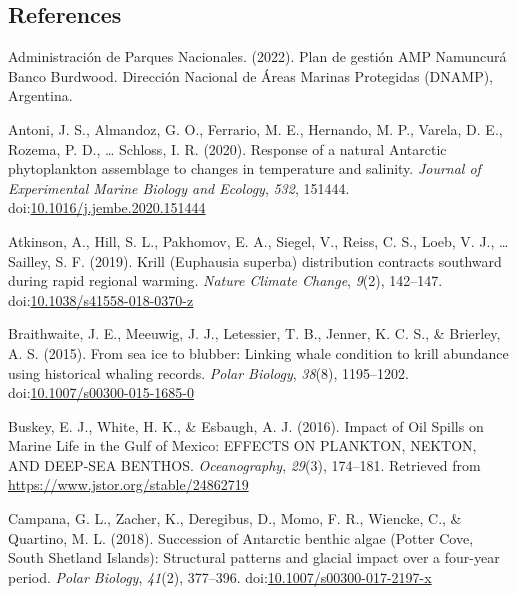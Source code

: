 \documentclass[
]{article}
\newlength{\cslhangindent}
\newenvironment{CSLReferences}[2] %
 {\begin{list}{}{%
  \setlength{\itemindent}{0pt}
  \setlength{\leftmargin}{0pt}
  \setlength{\parsep}{0pt}
  \ifodd #1
   \setlength{\leftmargin}{\cslhangindent}
   \setlength{\itemindent}{-1\cslhangindent}
  \fi
  \setlength{\itemsep}{#2\baselineskip}}}
 {\end{list}}
\begin{document}
\normalsize

\subsection*{References}\label{references}

\label{refs}
\begin{CSLReferences}{1}{0}
Administración de Parques Nacionales. (2022). {Plan de gestión AMP
Namuncurá Banco Burdwood}. {Dirección Nacional de Áreas Marinas
Protegidas (DNAMP), Argentina}.

Antoni, J. S., Almandoz, G. O., Ferrario, M. E., Hernando, M. P.,
Varela, D. E., Rozema, P. D., \ldots{} Schloss, I. R. (2020). Response
of a natural {Antarctic} phytoplankton assemblage to changes in
temperature and salinity. \emph{Journal of Experimental Marine Biology
and Ecology}, \emph{532}, 151444.
doi:\href{https://doi.org/10.1016/j.jembe.2020.151444}{10.1016/j.jembe.2020.151444}

Atkinson, A., Hill, S. L., Pakhomov, E. A., Siegel, V., Reiss, C. S.,
Loeb, V. J., \ldots{} Sailley, S. F. (2019). Krill ({Euphausia} superba)
distribution contracts southward during rapid regional warming.
\emph{Nature Climate Change}, \emph{9}(2), 142--147.
doi:\href{https://doi.org/10.1038/s41558-018-0370-z}{10.1038/s41558-018-0370-z}

Braithwaite, J. E., Meeuwig, J. J., Letessier, T. B., Jenner, K. C. S.,
\& Brierley, A. S. (2015). From sea ice to blubber: Linking whale
condition to krill abundance using historical whaling records.
\emph{Polar Biology}, \emph{38}(8), 1195--1202.
doi:\href{https://doi.org/10.1007/s00300-015-1685-0}{10.1007/s00300-015-1685-0}

Buskey, E. J., White, H. K., \& Esbaugh, A. J. (2016). Impact of {Oil
Spills} on {Marine Life} in the {Gulf} of {Mexico}: {EFFECTS ON
PLANKTON}, {NEKTON}, {AND DEEP-SEA BENTHOS}. \emph{Oceanography},
\emph{29}(3), 174--181. Retrieved from
\url{https://www.jstor.org/stable/24862719}

Campana, G. L., Zacher, K., Deregibus, D., Momo, F. R., Wiencke, C., \&
Quartino, M. L. (2018). Succession of {Antarctic} benthic algae ({Potter
Cove}, {South Shetland Islands}): Structural patterns and glacial impact
over a four-year period. \emph{Polar Biology}, \emph{41}(2), 377--396.
doi:\href{https://doi.org/10.1007/s00300-017-2197-x}{10.1007/s00300-017-2197-x}


\end{CSLReferences}
\end{document}
